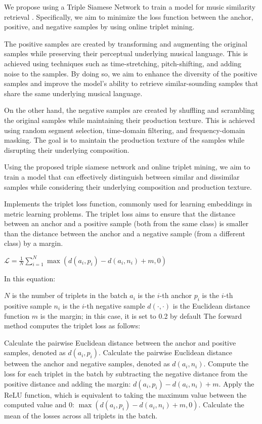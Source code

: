 We propose using a Triple Siamese Network to train a model for music similarity retrieval \cite{contentmusicsimtriplet2020}. Specifically, we aim to minimize the loss function between the anchor, positive, and negative samples by using online triplet mining.

The positive samples are created by transforming and augmenting the original samples while preserving their perceptual underlying musical language. This is achieved using techniques such as time-stretching, pitch-shifting, and adding noise to the samples. By doing so, we aim to enhance the diversity of the positive samples and improve the model's ability to retrieve similar-sounding samples that share the same underlying musical language.

On the other hand, the negative samples are created by shuffling and scrambling the original samples while maintaining their production texture. This is achieved using random segment selection, time-domain filtering, and frequency-domain masking. The goal is to maintain the production texture of the samples while disrupting their underlying composition.

Using the proposed triple siamese network and online triplet mining, we aim to train a model that can effectively distinguish between similar and dissimilar samples while considering their underlying composition and production texture.

 Implements the triplet loss function, commonly used for learning embeddings in metric learning problems. The triplet loss aims to ensure that the distance between an anchor and a positive sample (both from the same class) is smaller than the distance between the anchor and a negative sample (from a different class) by a margin.

$\mathcal{L} = \frac{1}{N}\sum_{i=1}^{N} \max \left( d\left(a_i, p_i\right) - d\left(a_i, n_i\right) + m, 0 \right)$

In this equation:

$N$ is the number of triplets in the batch
$a_i$ is the $i$-th anchor
$p_i$ is the $i$-th positive sample
$n_i$ is the $i$-th negative sample
$d(\cdot, \cdot)$ is the Euclidean distance function
$m$ is the margin; in this case, it is set to 0.2 by default
The forward method computes the triplet loss as follows:

Calculate the pairwise Euclidean distance between the anchor and positive samples, denoted as $d(a_i, p_i)$.
Calculate the pairwise Euclidean distance between the anchor and negative samples, denoted as $d(a_i, n_i)$.
Compute the loss for each triplet in the batch by subtracting the negative distance from the positive distance and adding the margin: $d(a_i, p_i) - d(a_i, n_i) + m$.
Apply the ReLU function, which is equivalent to taking the maximum value between the computed value and 0: $\max \left( d(a_i, p_i) - d(a_i, n_i) + m, 0 \right)$.
Calculate the mean of the losses across all triplets in the batch.